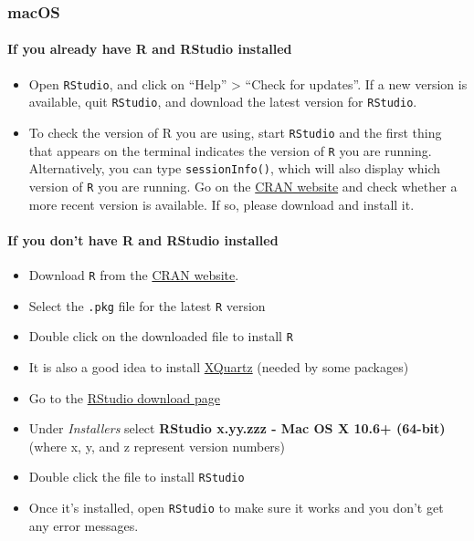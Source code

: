 \documentclass[
]{article}
\providecommand{\tightlist}{%
  \setlength{\itemsep}{0pt}\setlength{\parskip}{0pt}}
\begin{document}
\subsubsection{macOS}\label{macos}

\paragraph{If you already have R and RStudio
installed}\label{if-you-already-have-r-and-rstudio-installed-1}

\begin{itemize}
\tightlist
\item
  Open \texttt{RStudio}, and click on ``Help'' \textgreater{} ``Check
  for updates''. If a new version is available, quit \texttt{RStudio},
  and download the latest version for \texttt{RStudio}.
\item
  To check the version of R you are using, start \texttt{RStudio} and
  the first thing that appears on the terminal indicates the version of
  \texttt{R} you are running. Alternatively, you can type
  \texttt{sessionInfo()}, which will also display which version of
  \texttt{R} you are running. Go on the
  \href{https://cran.r-project.org/bin/macosx/}{CRAN website} and check
  whether a more recent version is available. If so, please download and
  install it.
\end{itemize}

\paragraph{If you don't have R and RStudio
installed}\label{if-you-dont-have-r-and-rstudio-installed-1}

\begin{itemize}
\tightlist
\item
  Download \texttt{R} from the
  \href{http://cran.r-project.org/bin/macosx}{CRAN website}.
\item
  Select the \texttt{.pkg} file for the latest \texttt{R} version
\item
  Double click on the downloaded file to install \texttt{R}
\item
  It is also a good idea to install
  \href{https://www.xquartz.org/}{XQuartz} (needed by some packages)
\item
  Go to the
  \href{https://www.rstudio.com/products/rstudio/download/\#download}{RStudio
  download page}
\item
  Under \emph{Installers} select \textbf{RStudio x.yy.zzz - Mac OS X
  10.6+ (64-bit)} (where x, y, and z represent version numbers)
\item
  Double click the file to install \texttt{RStudio}
\item
  Once it's installed, open \texttt{RStudio} to make sure it works and
  you don't get any error messages.
\end{itemize}
\end{document}
